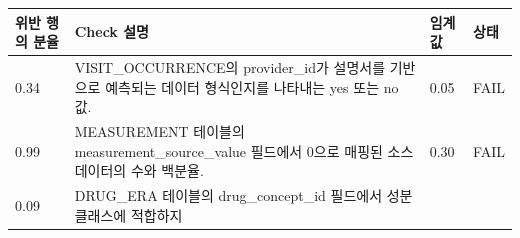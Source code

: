 \documentclass[11pt]{book}
\theoremstyle{definition}
\theoremstyle{definition}
\theoremstyle{definition}
\theoremstyle{remark}
\begin{document}
\begin{longtable}[]{@{}llll@{}}
\toprule
\begin{minipage}[b]{0.12\columnwidth}\raggedright\strut
위반 행의 분율\strut
\end{minipage} & \begin{minipage}[b]{0.47\columnwidth}\raggedright\strut
Check 설명\strut
\end{minipage} & \begin{minipage}[b]{0.10\columnwidth}\raggedright\strut
임계값\strut
\end{minipage} & \begin{minipage}[b]{0.07\columnwidth}\raggedright\strut
상태\strut
\end{minipage}\tabularnewline
\midrule
\endhead
\begin{minipage}[t]{0.12\columnwidth}\raggedright\strut
0.34\strut
\end{minipage} & \begin{minipage}[t]{0.47\columnwidth}\raggedright\strut
VISIT\_OCCURRENCE의 provider\_id가 설명서를 기반으로 예측되는 데이터
형식인지를 나타내는 yes 또는 no 값.\strut
\end{minipage} & \begin{minipage}[t]{0.10\columnwidth}\raggedright\strut
0.05\strut
\end{minipage} & \begin{minipage}[t]{0.07\columnwidth}\raggedright\strut
FAIL\strut
\end{minipage}\tabularnewline
\begin{minipage}[t]{0.12\columnwidth}\raggedright\strut
0.99\strut
\end{minipage} & \begin{minipage}[t]{0.47\columnwidth}\raggedright\strut
MEASUREMENT 테이블의 measurement\_source\_value 필드에서 0으로 매핑된
소스 데이터의 수와 백분율.\strut
\end{minipage} & \begin{minipage}[t]{0.10\columnwidth}\raggedright\strut
0.30\strut
\end{minipage} & \begin{minipage}[t]{0.07\columnwidth}\raggedright\strut
FAIL\strut
\end{minipage}\tabularnewline
\begin{minipage}[t]{0.12\columnwidth}\raggedright\strut
0.09\strut
\end{minipage} & \begin{minipage}[t]{0.47\columnwidth}\raggedright\strut
DRUG\_ERA 테이블의 drug\_concept\_id 필드에서 성분 클래스에 적합하지

\end{minipage}
\end{longtable}
\end{document}
